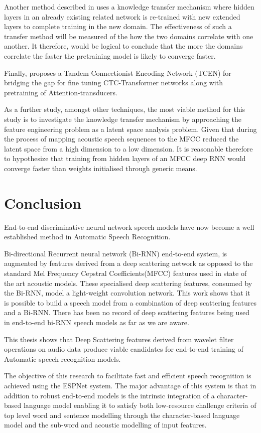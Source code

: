 Another method described in \citep{ramachandran2016unsupervised,} uses a knowledge transfer mechanism where hidden layers in an already existing related network is re-trained with new extended layers to complete training in the new domain.  The effectiveness of such a transfer method will be measured of the how the two domains correlate with one another. It therefore, would be logical to conclude that the more the domains correlate the faster the pretraining model is likely to converge faster.

Finally, \cite{wang2019bridging} proposes a Tandem Connectionist Encoding Network (TCEN) for bridging the gap for fine tuning CTC-Transformer networks along with pretraining of Attention-transducers.

As a further study, amongst other techniques, the most viable method for this study is to investigate the knowledge transfer mechanism by approaching the feature engineering problem as a latent space analysis problem.  Given that during the process of mapping acoustic speech sequences to the MFCC reduced the latent space from a high dimension to a low dimension.  It is reasonable therefore to hypothesize that training from hidden layers of an MFCC deep RNN would converge faster than weights initialised through generic means.

\section{Conclusion}
End-to-end discriminative neural network speech models have now become a well established method in Automatic Speech Recognition. 

Bi-directional Recurrent neural network (Bi-RNN) end-to-end system, is augmented by features derived from a deep scattering network as opposed to the standard Mel Frequency Cepstral Coefficients(MFCC) features used in state of the art acoustic models.  These specialised deep scattering features, consumed by the Bi-RNN, model a light-weight convolution network. This work shows that it is possible to build a speech model from a combination of deep scattering features and a Bi-RNN. There has been no record of deep scattering features being used in end-to-end bi-RNN speech models as far as we are aware.  

This thesis shows that Deep Scattering features derived from wavelet filter operations on audio data produce viable candidates for end-to-end training of Automatic speech recognition models.

The objective of this research to facilitate fast and efficient speech recognition is achieved using the ESPNet system.  The major advantage of this system is that in addition to robust end-to-end models is the intrinsic integration of a character-based language model enabling it to satisfy both low-resource challenge criteria of top level word and sentence modelling through the character-based language model and the sub-word and acoustic modelling of input features.